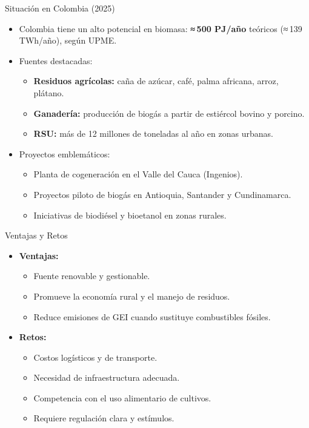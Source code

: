 \documentclass[main.tex]{subfiles}
\begin{document}
\begin{frame}{Situación en Colombia (2025)}
    \begin{itemize}
        \item Colombia tiene un alto potencial en biomasa: \textbf{≈ 500 PJ/año} teóricos (≈ 139 TWh/año), según UPME.
        \item Fuentes destacadas:
        \begin{itemize}
            \item \textbf{Residuos agrícolas:} caña de azúcar, café, palma africana, arroz, plátano.
            \item \textbf{Ganadería:} producción de biogás a partir de estiércol bovino y porcino.
            \item \textbf{RSU:} más de 12 millones de toneladas al año en zonas urbanas.
        \end{itemize}
        \item Proyectos emblemáticos:
        \begin{itemize}
            \item Planta de cogeneración en el Valle del Cauca (Ingenios).
            \item Proyectos piloto de biogás en Antioquia, Santander y Cundinamarca.
            \item Iniciativas de biodiésel y bioetanol en zonas rurales.
        \end{itemize}
    \end{itemize}
\end{frame}

\begin{frame}{Ventajas y Retos}
    \begin{itemize}
        \item \textbf{Ventajas:}
        \begin{itemize}
            \item Fuente renovable y gestionable.
            \item Promueve la economía rural y el manejo de residuos.
            \item Reduce emisiones de GEI cuando sustituye combustibles fósiles.
        \end{itemize}
        \item \textbf{Retos:}
        \begin{itemize}
            \item Costos logísticos y de transporte.
            \item Necesidad de infraestructura adecuada.
            \item Competencia con el uso alimentario de cultivos.
            \item Requiere regulación clara y estímulos.
        \end{itemize}
    \end{itemize}
\end{frame}
\end{document}
